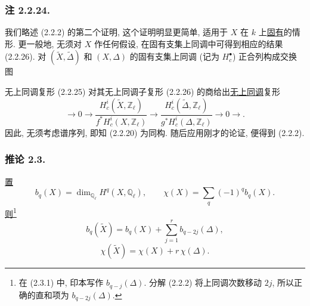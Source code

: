 \subsubsection*{注 2.2.24.}
我们略述 (2.2.2) 的第二个证明, 这个证明明显更简单, 适用于 $X$ 在 $k$ 上\underline{固有}的情形. 更一般地, 无须对 $X$ 作任何假设, 在固有支集上同调中可得到相应的结果 (2.2.26). 对 $(\widetilde X,\widetilde\Delta)$ 和 $(X,\Delta)$ 的固有支集上同调 (记为 $H_c^\bullet$) 正合列构成交换图
\begin{center}
\end{center}
无上同调复形 (2.2.25) 对其无上同调子复形 (2.2.26) 的商给出\underline{无上同调}复形
\begin{equation}\tag{2.2.27}
\longrightarrow 0\longrightarrow
\frac{H_c^i(\widetilde X,\mathbb Z_\ell)}
     {f^*H_c^i(X,\mathbb Z_\ell)}
\longrightarrow
\frac{H_c^i(\widetilde\Delta,\mathbb Z_\ell)}
     {g^*H_c^i(\Delta,\mathbb Z_\ell)}
\longrightarrow0\longrightarrow.
\end{equation}
因此, 无须考虑谱序列, 即知 (2.2.20) 为同构. 随后应用刚才的论证, 便得到 (2.2.2).

\subsubsection*{推论 2.3.}
\underline{置}
\[
b_q(X)=\dim_{\mathbb Q_\ell}H^q(X,\mathbb Q_\ell),
\qquad
\chi(X)=\sum_q(-1)^qb_q(X).
\]
\underline{则}\footnote{在 (2.3.1) 中, 印本写作 $b_{q-j}(\Delta)$. 分解 (2.2.2) 将上同调次数移动 $2j$, 所以正确的直和项为 $b_{q-2j}(\Delta)$.}
\begin{equation}\tag{2.3.1}
b_q(\widetilde X)
=b_q(X)+\sum_{j=1}^{r}b_{q-2j}(\Delta),
\end{equation}
\begin{equation}\tag{2.3.2}
\chi(\widetilde X)=\chi(X)+r\,\chi(\Delta).
\end{equation}
